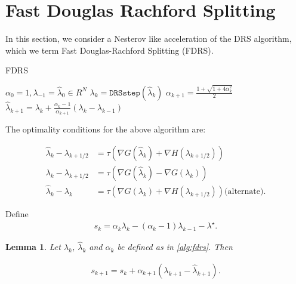 \documentclass[11pt]{article}
\def\grad {{\nabla}}
\newtheorem{lemma}{Lemma}
\begin{document}

\section{Fast Douglas Rachford Splitting}

In this section, we consider a Nesterov like acceleration of the DRS algorithm, which we term Fast Douglas-Rachford Splitting (FDRS).

\begin{algorithm}
\caption{FDRS}
\label{alg:fdrs}
\begin{algorithmic}[1]
\REQUIRE $\alpha_0 = 1, \lambda_{-1} = \hat\lambda_0 \in R^N$
\STATE $\lambda_k = \texttt{DRSstep}(\hat\lambda_k)$
\STATE $\alpha_{k+1} = \frac {1+\sqrt{1+4\alpha_k^2}}2$ \\
\STATE $\hat\lambda_{k+1} = \lambda_k + \frac {\alpha_k - 1}{\alpha_{k+1}}(\lambda_k - \lambda_{k-1})$
\ENDFOR
\end{algorithmic}
\end{algorithm}

The optimality conditions for the above algorithm are:

\begin{align}
\hat\lambda_k - \lambda_{k+1/2} &= \tau \left(\grad G(\hat\lambda_k) + \grad H(\lambda_{k+1/2}) \right) \label{opt:fdrs:1}\\
\lambda_k - \lambda_{k+1/2} &= \tau \left(\grad G(\hat\lambda_k) - \grad G(\lambda_k)\right) \label{opt:fdrs:2} \\
\hat\lambda_k - \lambda_k &= \tau \left(\grad G(\lambda_k) + \grad H(\lambda_{k+1/2})\right) \text{(alternate)}. \label{opt:fdrs:2:alt}
\end{align}

Define
\begin{align*}
s_k = \alpha_k\lambda_k - (\alpha_k - 1)\lambda_{k-1} - \lambda^\star.
\end{align*}

\begin{lemma}
\label{lem:2}
Let $\lambda_k$, $\hat\lambda_k$ and $\alpha_k$ be defined as in \cref{alg:fdrs}.  Then

\begin{align*}
s_{k+1} = s_k + \alpha_{k+1}(\lambda_{k+1} - \hat\lambda_{k+1}).
\end{align*}
\end{lemma}
\end{document}
